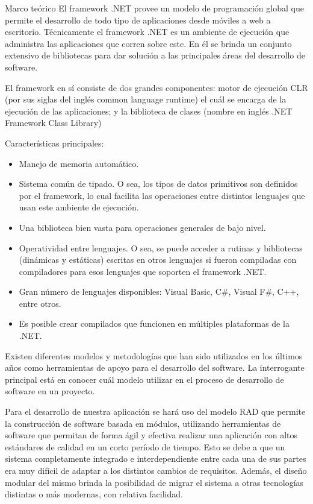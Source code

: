 \begin{thesischapter}{1} {Marco teórico}
    El framework .NET provee un modelo de programación global que permite el desarrollo de todo tipo de aplicaciones desde móviles a web a escritorio. Técnicamente el framework .NET es un ambiente de ejecución que administra las aplicaciones que corren sobre este. En él se brinda un conjunto extensivo de
    bibliotecas para dar solución a las principales áreas del desarrollo de software.

    El framework en sí consiste de dos grandes componentes: motor de ejecución CLR (por sus siglas del inglés common language runtime) el cuál se encarga de la
    ejecución de las aplicaciones; y la biblioteca de clases (nombre en inglés .NET Framework Class Library)~\cite{netframework}

    \vspace{2pt}
    Características principales:
    \begin{itemize}
        \item Manejo de memoria automático.
        \item Sistema común de tipado. O sea, los tipos de datos primitivos son definidos por el framework, lo cual facilita las operaciones entre distintos lenguajes que usan este ambiente de ejecución.
        \item Una biblioteca bien vasta para operaciones generales de bajo nivel.
        \item Operatividad entre lenguajes. O sea, se puede acceder a rutinas y bibliotecas (dinámicas y estáticas) escritas en otros lenguajes si fueron compiladas con compiladores para esos lenguajes que soporten el framework .NET.
        \item Gran número de lenguajes disponibles: Visual Basic, C\#, Visual F\#, C++, entre otros.
        \item Es posible crear compilados que funcionen en múltiples plataformas de la .NET.
    \end{itemize}

    Existen diferentes modelos y metodologías que han sido utilizados en los últimos años como herramientas de apoyo para el desarrollo del software. La interrogante principal está en conocer cuál modelo utilizar en el proceso de desarrollo de software en un proyecto.~\cite{DELGADOOLIVERA2021}
    
    \vspace{2pt}
    Para el desarrollo de nuestra aplicación se hará uso del modelo RAD que permite la construcción de software basada en módulos, utilizando herramientas de software que permitan de forma ágil y efectiva realizar una aplicación con altos estándares de calidad en un corto período de tiempo. Esto se debe a que un sistema completamente integrado e interdependiente entre cada una de sus partes era muy difícil de adaptar a los distintos cambios de requisitos. Además, el diseño modular del mismo brinda la posibilidad de migrar el sistema a otras tecnologías distintas o más modernas, con relativa facilidad.
    

\end{thesischapter}
